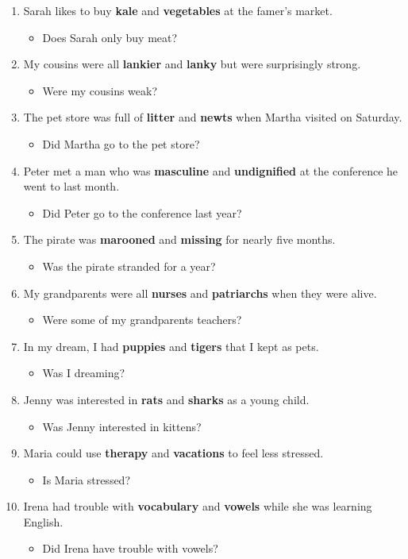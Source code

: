 \documentclass[authoryear]{elsarticle}
\begin{document}
\begin{enumerate}
\item Sarah likes to buy \textbf{kale} and \textbf{vegetables} at the famer's market.	\begin{itemize} \item Does Sarah only buy meat?\end{itemize}
\item My cousins were all \textbf{lankier} and \textbf{lanky} but were surprisingly strong.	\begin{itemize} \item Were my cousins weak?\end{itemize}
\item The pet store was full of \textbf{litter} and \textbf{newts} when Martha visited on Saturday.	\begin{itemize} \item Did Martha go to the pet store?\end{itemize}
\item Peter met a man who was \textbf{masculine} and \textbf{undignified} at the conference he went to last month.	\begin{itemize} \item Did Peter go to the conference last year?\end{itemize}
\item The pirate was \textbf{marooned} and \textbf{missing} for nearly five months.	\begin{itemize} \item Was the pirate stranded for a year?\end{itemize}
\item My grandparents were all \textbf{nurses} and \textbf{patriarchs} when they were alive.	\begin{itemize} \item Were some of my grandparents teachers?\end{itemize}
\item In my dream, I had \textbf{puppies} and \textbf{tigers} that I kept as pets.	\begin{itemize} \item Was I dreaming?\end{itemize}
\item Jenny was interested in \textbf{rats} and \textbf{sharks} as a young child.	\begin{itemize} \item Was Jenny interested in kittens?\end{itemize}
\item Maria could use \textbf{therapy} and \textbf{vacations} to feel less stressed.	\begin{itemize} \item Is Maria stressed?\end{itemize}
\item Irena had trouble with \textbf{vocabulary} and \textbf{vowels} while she was learning English.	\begin{itemize} \item Did Irena have trouble with vowels?\end{itemize}\end{enumerate}
\end{document}
